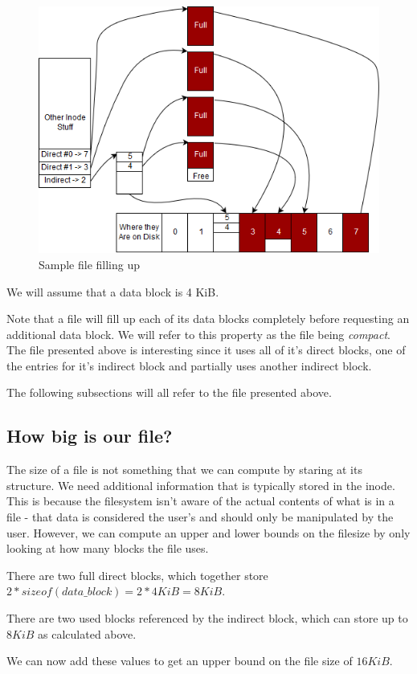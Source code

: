 \begin{figure}[htbp]
\centering
\includegraphics[width=.8\textwidth]{filesystems/images/sample_file.png}
\caption{Sample file filling up}
\end{figure}

We will assume that a data block is 4 KiB.

Note that a file will fill up each of its data blocks completely before requesting an additional data block.
We will refer to this property as the file being \textit{compact}.
The file presented above is interesting since it uses all of it's direct blocks, one of the entries for it's indirect block and partially uses another indirect block.

The following subsections will all refer to the file presented above.

\subsection{How big is our file?}
The size of a file is not something that we can compute by staring at its structure.
We need additional information that is typically stored in the inode.
This is because the filesystem isn't aware of the actual contents of what is in a file - that data is considered the user's and should only be manipulated by the user.
However, we can compute an upper and lower bounds on the filesize by only looking at how many blocks the file uses.

There are two full direct blocks, which together store $2*sizeof(data\_block)=2*4KiB=8KiB$.

There are two used blocks referenced by the indirect block, which can store up to $8KiB$ as calculated above.

We can now add these values to get an upper bound on the file size of $16KiB$.

